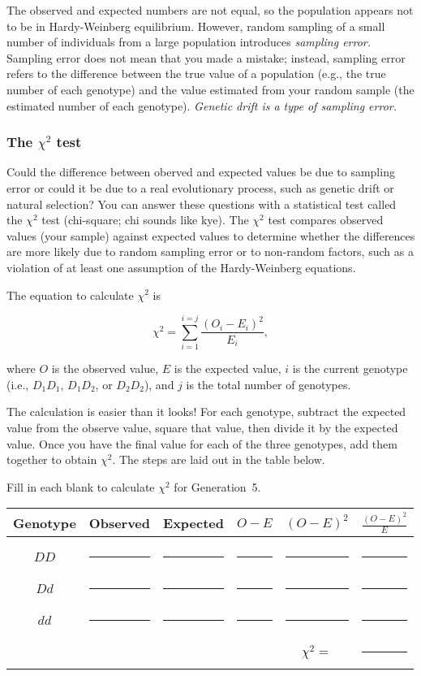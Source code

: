 \documentclass[12pt, hidelinks]{exam}
\begin{document}
\begin{questions}
The observed and expected numbers are not equal, so the population appears not 
to be in Hardy-Weinberg equilibrium. However, random sampling of a small number 
of individuals from a large population introduces \emph{sampling error.} Sampling 
error does not mean that you made a mistake; instead, sampling error refers to 
the difference between the true value of a population (e.g., the true number of 
each genotype) and the value estimated from your random sample (the estimated 
number of each genotype). \emph{Genetic drift is a type of sampling error.}

\subsubsection*{The $\chi^2$ test}

Could the difference between oberved and expected values be due to sampling 
error or could it be due to a real evolutionary process, such as genetic drift 
or natural selection? You can answer these questions with a statistical test 
called the $\chi^2$ test (chi-square; chi sounds like kye). The $\chi^2$ test 
compares observed values (your sample) against expected values to determine 
whether the differences are more likely due to random sampling error or to 
non-random factors, such as a violation of at least one assumption of the 
Hardy-Weinberg equations.

The equation to calculate $\chi^2$ is 

\[\chi^2 = \sum_{i=1}^{i=j}\frac{(O_i - E_i)^2}{E_i}, \]

where $O$ is the observed value, $E$ is the expected value, $i$ is the current 
genotype (i.e., $D_1D_1$, $ D_1D_2$, or $D_2D_2$), and $j$ is the total number 
of genotypes. 

The calculation is easier than it looks! For each genotype, subtract the 
expected value from the observe value, square that value, then divide it 
by the expected value. Once you have the final value for each of the three 
genotypes, add them together to obtain $\chi^2$. The steps are laid out 
in the table below. 

\newpage

\question[Checkout]
Fill in each blank to calculate $\chi^2$ for Generation~5.

\begin{longtable}{cccccc}
	\toprule
	Genotype & Observed & Expected & $O-E$ & $(O-E)^2$ & $\frac{(O-E)^2}{E}$ \tabularnewline
	\midrule
	&&&&&\tabularnewline
	$DD$ & \rule{0.5in}{0.4pt} & \rule{0.5in}{0.4pt} & \rule{0.5in}{0.4pt} & \rule{0.5in}{0.4pt} & \rule{0.5in}{0.4pt}\tabularnewline[2em]
	$Dd$ & \rule{0.5in}{0.4pt} & \rule{0.5in}{0.4pt} & \rule{0.5in}{0.4pt} & \rule{0.5in}{0.4pt} & \rule{0.5in}{0.4pt}\tabularnewline[2em]
	$dd$ & \rule{0.5in}{0.4pt} & \rule{0.5in}{0.4pt} & \rule{0.5in}{0.4pt} & \rule{0.5in}{0.4pt} & \rule{0.5in}{0.4pt}\tabularnewline[2em]
	&&&& $\chi^2 = $& \rule{0.5in}{0.4pt}\tabularnewline
	\bottomrule
\end{longtable}


\end{questions}
\end{document}
